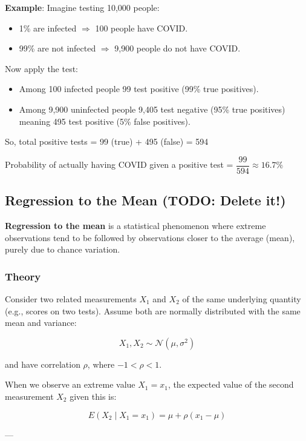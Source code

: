\documentclass[twoside]{book}
\begin{document}
\textbf{Example}: Imagine testing 10{,}000 people:

\begin{itemize}
    \item 1\% are infected $\Rightarrow$ 100 people have COVID.
    \item 99\% are not infected $\Rightarrow$ 9{,}900 people do not have COVID.
\end{itemize}

Now apply the test:

\begin{itemize}
    \item Among 100 infected people 99 test positive (99\% true positives).
    \item Among 9{,}900 uninfected people 9{,}405 test negative (95\% true positives) meaning 495 test positive (5\% false positives).
\end{itemize}

\noindent
So, total positive tests = 99 (true) + 495 (false) = 594

Probability of actually having COVID given a positive test = $ \dfrac{99}{594} \approx 16.7\% $

\subsection{Regression to the Mean (TODO: Delete it!)}

\textbf{Regression to the mean} is a statistical phenomenon where extreme observations tend to be followed by observations closer to the average (mean), purely due to chance variation.

\subsubsection*{Theory}

Consider two related measurements \(X_1\) and \(X_2\) of the same underlying quantity (e.g., scores on two tests). Assume both are normally distributed with the same mean and variance:

\[
X_1, X_2 \sim \mathcal{N}(\mu, \sigma^2)
\]

and have correlation \(\rho\), where \(-1 < \rho < 1\).

When we observe an extreme value \(X_1 = x_1\), the expected value of the second measurement \(X_2\) given this is:

\[
E(X_2 \mid X_1 = x_1) = \mu + \rho (x_1 - \mu)
\]

---
\end{document}
